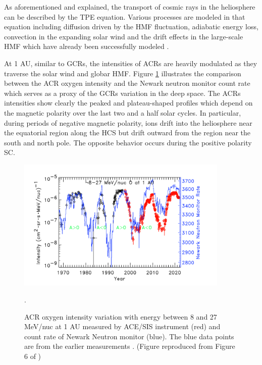 As aforementioned and explained, the transport of cosmic rays in the heliosphere can be described by the \ac{TPE} equation. Various processes are modeled in that equation including diffusion driven by the \ac{HMF} fluctuation, adiabatic energy loss, convection in the expanding solar wind and the drift effects in the large-scale \ac{HMF} which have already been successfully modeled \citep{Parker1965Pss, Jokipii1977ApJ, Jokipii1981ApJ}.

At 1 AU, similar to \acp{GCR}, the intensities of \acp{ACR} are heavily modulated as they traverse the solar wind and globar \ac{HMF}. Figure \ref{Fig:ACR_solarmodulation} illustrates the comparison between the \ac{ACR} oxygen intensity and the Newark neutron monitor count rate which serves as a proxy of the \acp{GCR} variation in the deep space. The \acp{ACR} intensities show clearly the peaked and plateau-shaped profiles which depend on the magnetic polarity over the last two and a half solar cycles. In particular, during periods of negative magnetic polarity, ions drift into the heliosphere near the equatorial region along the \ac{HCS} but drift outward from the region near the south and north pole. The opposite behavior occurs during the positive polarity \acl{SC}.



\begin{figure}
	\centering
	\includegraphics[width = 0.9\textwidth]{images/ACR_solarmodulation.png}
	\caption[Long term variation of \ac{ACR} oxygen and neutron monitor count rate]{ACR oxygen intensity variation with energy between 8 and 27 MeV/nuc at 1 AU measured by ACE/SIS instrument (red) and count rate of Newark Neutron monitor (blue). The blue data points are from the earlier measurements \citep{Mewaldt1993GeoRL}. (Figure reproduced from Figure 6 of \citet{Giacalone2022SSRv})}.
	\label{Fig:ACR_solarmodulation}
\end{figure}


